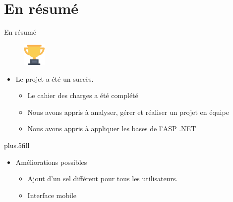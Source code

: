 \section*{En résumé}

\begin{frame}{En résumé}
\begin{figure}[h!]
  \includegraphics[width=0.10\textwidth]{images/Winner_1-512}
\end{figure}
  \begin{itemize}
  \item
    Le projet a été un succès.
 \begin{itemize}
  \item
    Le cahier des charges a été complété
  \item
    Nous avons appris à analyser, gérer et réaliser un projet en équipe
\item Nous avons appris à appliquer les bases de l'ASP .NET
 \end{itemize}
  \end{itemize}
  
  \vskip0pt plus.5fill
  \begin{itemize}
  \item
    Améliorations possibles
    \begin{itemize}
     \item Ajout d'un sel différent pour tous les utilisateurs.
     \item Interface mobile
    \end{itemize}
  \end{itemize}
\end{frame}